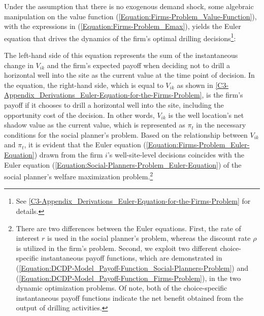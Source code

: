 Under the assumption that there is no exogenous demand shock, some algebraic manipulation on the value function (\ref{Equation:Firms-Problem_Value-Function}), with the expressions in (\ref{Equation:Firms-Problem_Emax}), yields the Euler equation that drives the dynamics of the firm's optimal drilling decisions\footnote{See \ref{C3-Appendix_Derivations_Euler-Equation-for-the-Firms-Problem} for details.}:

The left-hand side of this equation represents the sum of the instantaneous change in $V_{ik}$ and the firm's expected payoff when deciding not to drill a horizontal well into the site as the current value at the time point of decision. In the equation, the right-hand side, which is equal to $V_{ik}$ as shown in \ref{C3-Appendix_Derivations_Euler-Equation-for-the-Firms-Problem}, is the firm's payoff if it chooses to drill a horizontal well into the site, including the opportunity cost of the decision. In other words, $V_{ik}$ is the well location's net shadow value as the current value, which is represented as $\pi_{t}$ in the necessary conditions for the social planner's problem. Based on the relationship between $V_{ik}$ and $\pi_{t}$, it is evident that the Euler equation (\ref{Equation:Firms-Problem_Euler-Equation}) drawn from the firm $i$'s well-site-level decisions coincides with the Euler equation (\ref{Equation:Social-Planners-Problem_Euler-Equation}) of the social planner's welfare maximization problem.\footnote{There are two differences between the Euler equations. First, the rate of interest $r$ is used in the social planner's problem, whereas the discount rate $\rho$ is utilized in the firm's problem. Second, we exploit two different choice-specific instantaneous payoff functions, which are demonstrated in (\ref{Equation:DCDP-Model_Payoff-Function_Social-Planners-Problem}) and (\ref{Equation:DCDP-Model_Payoff-Function_Firms-Problem}), in the two dynamic optimization problems. Of note, both of the choice-specific instantaneous payoff functions indicate the net benefit obtained from the output of drilling activities.}
